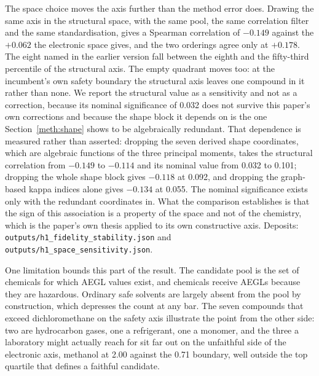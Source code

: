 \documentclass[11pt,a4paper]{article}
\begin{document}
The space choice moves the axis further than the method error does. Drawing the
same axis in the structural space, with the same pool, the same correlation
filter and the same standardisation, gives a Spearman correlation of $-0.149$
against the $+0.062$ the electronic space gives, and the two orderings agree
only at $+0.178$. The eight named in the earlier version fall between the
eighth and the fifty-third percentile of the structural axis. The empty quadrant
moves too: at the incumbent's own safety boundary the structural axis leaves one
compound in it rather than none. We report the structural value as a sensitivity
and not as a correction, because its nominal significance of 0.032 does not
survive this paper's own corrections and because the shape block it depends on
is the one Section~\ref{meth:shape} shows to be algebraically redundant. That
dependence is measured rather than asserted: dropping the seven derived shape
coordinates, which are algebraic functions of the three principal moments,
takes the structural correlation from $-0.149$ to $-0.114$ and its nominal
value from 0.032 to 0.101; dropping the whole shape block gives $-0.118$ at
0.092, and dropping the graph-based kappa indices alone gives $-0.134$ at
0.055. The
nominal significance exists only with the redundant coordinates in. What
the comparison establishes is that the sign of this association is a property of
the space and not of the chemistry, which is the paper's own thesis applied to
its own constructive axis. Deposits:
\texttt{outputs/h1\_fidelity\_stability.json} and
\texttt{outputs/h1\_space\_sensitivity.json}.

One limitation bounds this part of the result. The candidate pool is the set of
chemicals for which AEGL values exist, and chemicals receive AEGLs because they
are hazardous. Ordinary safe solvents are largely absent from the pool by
construction, which depresses the count at any bar. The seven compounds that
exceed dichloromethane on the safety axis illustrate the point from the other
side: two are hydrocarbon gases, one a refrigerant, one a monomer, and the three
a laboratory might actually reach for sit far out on the unfaithful side of the
electronic axis, methanol at 2.00 against the 0.71 boundary, well outside the
top quartile that defines a faithful candidate.
\end{document}
